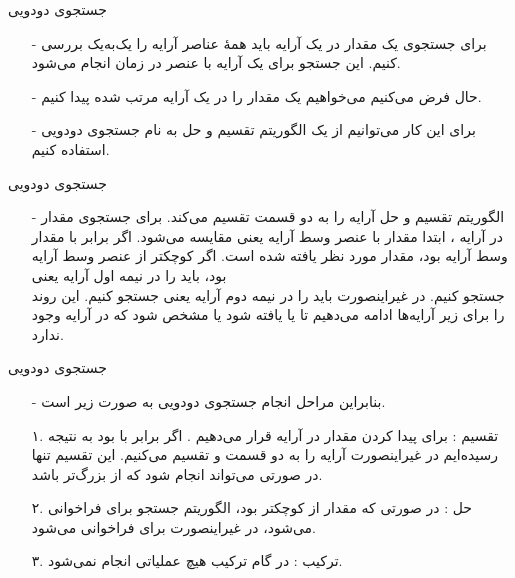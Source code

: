 
\begin{frame}{‌جستجوی دودویی}
\begin{itemize}\itemr
\item[-]
برای جستجوی یک مقدار در یک آرایه باید همهٔ عناصر آرایه را یک‌به‌یک بررسی کنیم. این جستجو برای یک آرایه با
عنصر در زمان
انجام می‌شود.
\item[-]
حال فرض می‌کنیم می‌خواهیم یک مقدار را در یک آرایه مرتب شده پیدا کنیم.
\item[-]
برای این کار می‌توانیم از یک الگوریتم تقسیم و حل به نام جستجوی دودویی
استفاده کنیم.
\end{itemize}
\end{frame}


\begin{frame}{‌جستجوی دودویی}
\begin{itemize}\itemr
\item[-]
الگوریتم تقسیم و حل آرایه را به دو قسمت تقسیم می‌کند. برای جستجوی مقدار
در آرایه
، ابتدا مقدار
با عنصر وسط آرایه یعنی
مقایسه می‌شود. اگر
برابر با مقدار وسط آرایه بود، مقدار مورد نظر یافته شده است. اگر
کوچکتر از عنصر وسط آرایه بود، باید
را در نیمه اول آرایه یعنی\\
جستجو کنیم. در غیراینصورت باید
را در نیمه دوم آرایه یعنی
جستجو کنیم. این روند را برای زیر آرایه‌ها ادامه می‌دهیم تا یا
یافته شود یا مشخص شود که
در آرایه وجود ندارد.
\end{itemize}
\end{frame}


\begin{frame}{‌جستجوی دودویی}
\begin{itemize}\itemr
\item[-]
بنابراین مراحل انجام جستجوی دودویی به صورت زیر است.
\item[۱.]
تقسیم : برای پیدا کردن مقدار
در آرایه
قرار می‌دهیم
 .
اگر
برابر با
بود به نتیجه رسیده‌ایم در غیراینصورت آرایه را به دو قسمت
و
تقسیم می‌کنیم. این تقسیم تنها در صورتی می‌تواند انجام شود که
از
بزرگ‌تر باشد.
\item[۲.]
حل : در صورتی که مقدار
از
کوچکتر بود، الگوریتم جستجو برای
فراخوانی می‌شود، در غیراینصورت برای
فراخوانی می‌شود.
\item[۳.]
ترکیب : در گام ترکیب هیچ عملیاتی انجام نمی‌شود.
\end{itemize}
\end{frame}


